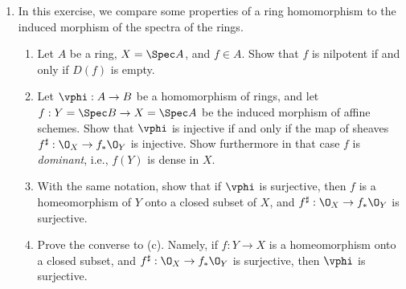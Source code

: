 \documentclass[12pt]{amsart}
\begin{document}
\begin{enumerate}
	\item[2.18.] {
      In this exercise, we compare some properties of a ring homomorphism to the induced morphism of the spectra of the rings.
      \begin{enumerate}
        \item Let $A$ be a ring, $X=\Spec A$, and $f\in A$.
          Show that $f$ is nilpotent if and only if $D(f)$ is empty.
        \item Let $\vphi:A\to B$ be a homomorphism of rings, and let $f:Y=\Spec B\to X=\Spec A$ be the induced morphism of affine schemes.
          Show that $\vphi$ is injective if and only if the map of sheaves $f^\sharp:\O_X\to f_*\O_Y$ is injective.
          Show furthermore in that case $f$ is \emph{dominant}, i.e., $f(Y)$ is dense in $X$.
        \item With the same notation, show that if $\vphi$ is surjective, then $f$ is a homeomorphism of $Y$ onto a closed subset of $X$, and $f^\sharp:\O_X\to f_*\O_Y$ is surjective.
        \item Prove the converse to (c).
          Namely, if $f:Y\to X$ is a homeomorphism onto a closed subset, and $f^\sharp:\O_X\to f_*\O_Y$ is surjective, then $\vphi$ is surjective.
      \end{enumerate}
    }
\end{enumerate}
\end{document}
